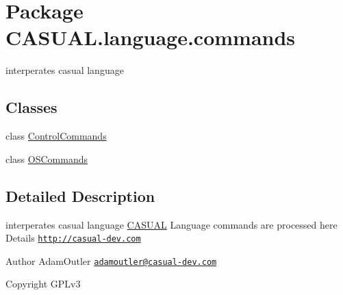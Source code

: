 \hypertarget{namespace_c_a_s_u_a_l_1_1language_1_1commands}{\section{Package C\-A\-S\-U\-A\-L.\-language.\-commands}
\label{namespace_c_a_s_u_a_l_1_1language_1_1commands}
}


interperates casual language  


\subsection*{Classes}
\begin{DoxyCompactItemize}
\item 
class \hyperlink{class_c_a_s_u_a_l_1_1language_1_1commands_1_1_control_commands}{Control\-Commands}
\item 
class \hyperlink{class_c_a_s_u_a_l_1_1language_1_1commands_1_1_o_s_commands}{O\-S\-Commands}
\end{DoxyCompactItemize}


\subsection{Detailed Description}
interperates casual language \hyperlink{namespace_c_a_s_u_a_l}{C\-A\-S\-U\-A\-L} Language commands are processed here Details \href{http://casual-dev.com}{\tt http\-://casual-\/dev.\-com} \begin{DoxyAuthor}{Author}
Adam\-Outler \href{mailto:adamoutler@casual-dev.com}{\tt adamoutler@casual-\/dev.\-com} 
\end{DoxyAuthor}
\begin{DoxyCopyright}{Copyright}
G\-P\-Lv3 
\end{DoxyCopyright}
